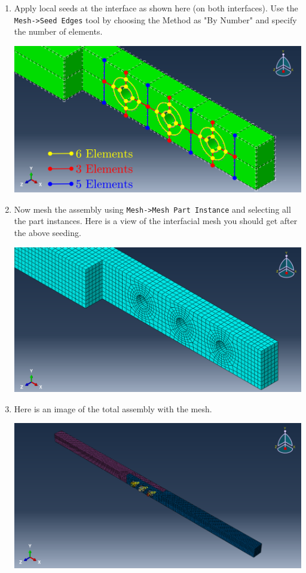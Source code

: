 \documentclass[11pt]{article}
\begin{document}
\begin{enumerate}
\begin{center}
\end{center}
\item Apply local seeds at the interface as shown here (on both interfaces).
Use the \texttt{Mesh->Seed Edges} tool by choosing the Method as "By Number" and specify the number of elements.
\begin{center}
\includegraphics[width=.9\linewidth]{./figs/lmeshseeds.png}
\end{center}
\item Now mesh the assembly using \texttt{Mesh->Mesh Part Instance} and selecting all the part instances.
Here is a view of the interfacial mesh you should get after the above seeding.
\begin{center}
\includegraphics[width=.9\linewidth]{./figs/mesh.png}
\end{center}
\item Here is an image of the total assembly with the mesh.
\begin{center}
\includegraphics[width=.9\linewidth]{./figs/fullmesh.png}
\end{center}
\end{enumerate}
\end{document}
